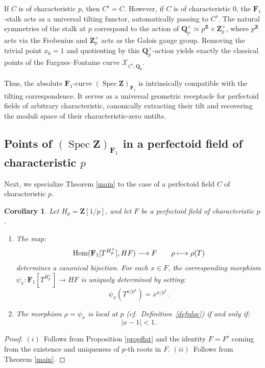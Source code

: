 \documentclass[11pt,a4paper]{article}
\newtheorem{corollary}[theorem]{Corollary}
\newcommand{\Q}{\mathbf{Q}}
\newcommand{\Z}{\mathbf{Z}}
\newcommand{\Fone}{\mathbf{F}_{1}}
\def\spzf{(\Spec \Z)_{\mathbf{F}_{1}}}
\newcommand{\Hom}{{\rm{Hom}}}
\newcommand{\Spec}{\operatorname{Spec}}
\def\cf{{\it cf.\/}\ }
\begin{document}
If $C$ is of characteristic $p$, then $C^\flat = C$. However, if $C$ is of characteristic $0$, the $\Fone$-stalk acts as a universal tilting functor, automatically passing to $C^\flat$. The natural symmetries of the stalk at $p$ correspond to the action of $\Q_p^\times \simeq p^\Z \times \Z_p^\times$, where $p^\Z$ acts via the Frobenius and $\Z_p^\times$ acts as the Galois gauge group. Removing the trivial point $x_0=1$ and quotienting by this $\Q_p^\times$-action yields exactly the classical points of the Fargues--Fontaine curve $\mathcal{X}_{C^\flat, \Q_p}$.\vspace{.03in} 

Thus, the absolute $\Fone$-curve $\spzf$ is intrinsically compatible with the tilting correspondence. It serves as a universal geometric receptacle for perfectoid fields of arbitrary characteristic, canonically extracting their tilt and recovering the moduli space of their characteristic-zero untilts.



\subsection{Points of $\spzf$ in a perfectoid field of characteristic $p$}

Next, we specialize Theorem  \ref{main} to 
the case of a perfectoid field $C$ of characteristic $p$. 

\begin{corollary}\label{basic} 
Let $H_p = \Z[1/p]$, and let $F$ be a perfectoid field 
of characteristic $p$.
\begin{enumerate}
    \item[(i)] The  map: 
    \[
\Hom(\Fone[T^{H_p^+}],HF)\longrightarrow F\qquad \rho \longmapsto \rho(T)
    \]
    determines  a canonical bijection. 
    For each $x \in F$, the corresponding morphism 
    $\psi_x: \Fone[T^{H_p^+}]\to HF$ is uniquely determined by setting:
    \[
    \psi_x(T^{a/p^k}) = x^{a/p^k}.
    \]

    \item[(ii)] The morphism $\rho = \psi_x$ is local 
    at $p$ (\cf Definition~\ref{defnloc}) 
    if and only if: 
    \[
    |x - 1| < 1.
    \]
\end{enumerate}
\end{corollary}

\begin{proof}
$(i)$~Follows from Proposition \ref{propflat} and the identity $F=F^\flat$ coming from the existence and uniqueness of $p$-th roots in $F$.\newline
$(ii)$~Follows from Theorem \ref{main}.
\end{proof}
\end{document}
